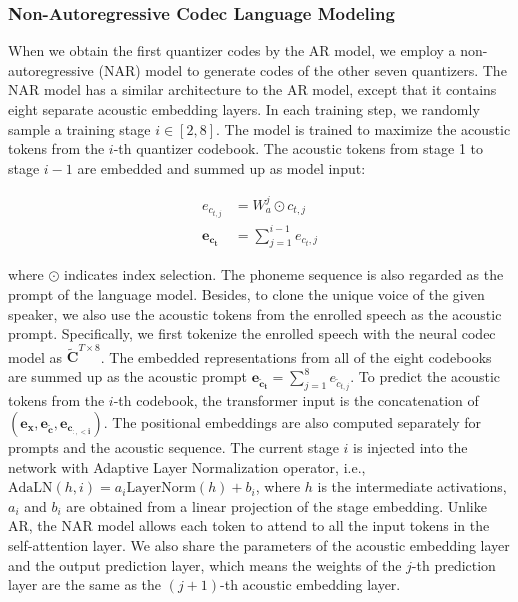 \documentclass{article}
\theoremstyle{plain}
\theoremstyle{definition}
\theoremstyle{remark}
\begin{document}
\subsubsection{Non-Autoregressive Codec Language Modeling}
When we obtain the first quantizer codes by the AR model, we employ 
 a non-autoregressive (NAR) model   to generate codes of the other seven quantizers.  
The NAR model has a similar architecture to the AR model, except that it contains eight separate acoustic embedding layers. In each training step, we randomly sample a training stage $i \in [2, 8]$. The model is trained to maximize the acoustic tokens from the $i$-th quantizer codebook. The acoustic tokens from stage 1 to stage $i-1$ are embedded and summed up as model input:
\begin{small}
\begin{align}
    e_{c_{t,j}} &= W_a^j \odot {c_{t,j}} \\
    \mathbf{e_{c_t}} &= \sum_{j=1}^{i-1} e_{c_t,j}
\end{align}
\end{small}where $\odot$ indicates index selection.  The phoneme sequence is also regarded as the prompt of the language model. Besides, to clone the unique voice of the given speaker, we also use the acoustic tokens from the enrolled speech as the acoustic prompt. Specifically, we first tokenize the enrolled speech with the neural codec model as $\mathbf{\tilde{C}}^{T\times8}$. The embedded representations from all of the eight codebooks are summed up as the acoustic prompt $\mathbf{e_{\tilde{c}_t}} = \sum_{j=1}^{8} e_{\tilde{c}_{t,j}}$.
To predict the acoustic tokens from the $i$-th codebook, the transformer input is the concatenation of $(\mathbf{e_x}, \mathbf{e_{\tilde{c}}}, \mathbf{e_{c_{:,<i}}})$. The positional embeddings are also computed separately for prompts and the acoustic sequence. 
 The current stage $i$ is injected into the network with Adaptive Layer Normalization \citep{DBLP:conf/nips/Xu0ZZL19} operator, i.e., $\text{AdaLN}(h, i) = a_i\text{LayerNorm}(h)+b_i$, where $h$ is the intermediate activations, $a_i$ and $b_i$ are obtained from a linear projection of the stage embedding. Unlike AR, the NAR model allows each token to attend to all the input tokens in the self-attention layer.
 We also share the parameters of the acoustic embedding layer and the output prediction layer, which means the weights of the $j$-th prediction layer are the same as the $(j+1)$-th acoustic embedding layer.

\end{document}
